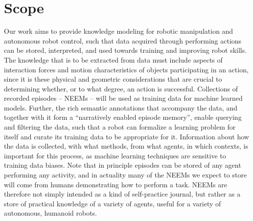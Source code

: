 \section{Scope} %
\label{sec:scope}

Our work aims to provide knowledge modeling for robotic manipulation and autonomous robot control, such that data acquired through performing actions can be stored, interpreted, and used towards training and improving robot skills. 
The knowledge that is to be extracted from data must include aspects of interaction forces and motion characteristics of objects participating in an action, since it is these physical and geometric considerations that are crucial to determining whether, or to what degree, an action is successful. Collections of recorded episodes -- NEEMs -- will be used as training data for machine learned models. Further, the rich semantic annotations that accompany the data, and together with it form a ``narratively enabled episode memory'', enable querying and filtering the data, such that a robot can formalize a learning problem for itself and curate its training data to be appropriate for it. Information about how the data is collected, with what methods, from what agents, in which contexts, is important for this process, as machine learning techniques are sensitive to training data biases. Note that in principle episodes can be stored of any agent performing any activity, and in actuality many of the NEEMs we expect to store will come from humans demonstrating how to perform a task. NEEMs are therefore not simply intended as a kind of self-practice journal, but rather as a store of practical knowledge of a variety of agents, useful for a variety of autonomous, humanoid robots.


